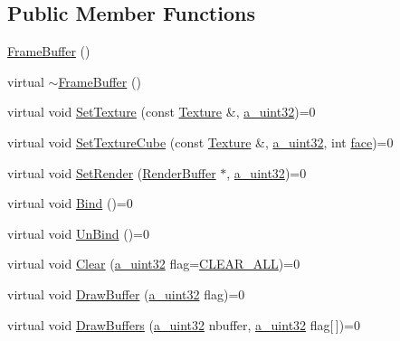 \subsection*{Public Member Functions}
\begin{DoxyCompactItemize}
\item 
\hyperlink{class_agmd_1_1_frame_buffer_a4c4496f6f37c392bccf0e2e40c96c41e}{Frame\+Buffer} ()
\item 
virtual \hyperlink{class_agmd_1_1_frame_buffer_a8a63285b76eb2c7c2b70e28b96c2b15f}{$\sim$\+Frame\+Buffer} ()
\item 
virtual void \hyperlink{class_agmd_1_1_frame_buffer_a76ffe93cffad0a95befbee4dc575487a}{Set\+Texture} (const \hyperlink{class_agmd_1_1_texture}{Texture} \&, \hyperlink{_common_defines_8h_a964296f9770051b9e4807b1f180dd416}{a\+\_\+uint32})=0
\item 
virtual void \hyperlink{class_agmd_1_1_frame_buffer_a8586a1e4fa08ec43a21f73139fa01fba}{Set\+Texture\+Cube} (const \hyperlink{class_agmd_1_1_texture}{Texture} \&, \hyperlink{_common_defines_8h_a964296f9770051b9e4807b1f180dd416}{a\+\_\+uint32}, int \hyperlink{_planet_8cpp_ae1161f79bdbe47164b23549af2139d25}{face})=0
\item 
virtual void \hyperlink{class_agmd_1_1_frame_buffer_ab31c37e22dba1f299186026d597d7377}{Set\+Render} (\hyperlink{class_agmd_1_1_render_buffer}{Render\+Buffer} $\ast$, \hyperlink{_common_defines_8h_a964296f9770051b9e4807b1f180dd416}{a\+\_\+uint32})=0
\item 
virtual void \hyperlink{class_agmd_1_1_frame_buffer_adbe54d16610cf433ed300797795d51f4}{Bind} ()=0
\item 
virtual void \hyperlink{class_agmd_1_1_frame_buffer_a8e656e8cdc0a35da9ef7ce8cfc162b25}{Un\+Bind} ()=0
\item 
virtual void \hyperlink{class_agmd_1_1_frame_buffer_a2ea4be225c7cfab68f85329022651b80}{Clear} (\hyperlink{_common_defines_8h_a964296f9770051b9e4807b1f180dd416}{a\+\_\+uint32} flag=\hyperlink{namespace_agmd_aeb00eaafdbba0fbe6b35d082f4ba0123a71cd6105bdf489841066bcc89fc2938b}{C\+L\+E\+A\+R\+\_\+\+A\+L\+L})=0
\item 
virtual void \hyperlink{class_agmd_1_1_frame_buffer_adf021c722b925f183980fb402fccec41}{Draw\+Buffer} (\hyperlink{_common_defines_8h_a964296f9770051b9e4807b1f180dd416}{a\+\_\+uint32} flag)=0
\item 
virtual void \hyperlink{class_agmd_1_1_frame_buffer_aa8c9362a32a4f8d83be2029adb341688}{Draw\+Buffers} (\hyperlink{_common_defines_8h_a964296f9770051b9e4807b1f180dd416}{a\+\_\+uint32} nbuffer, \hyperlink{_common_defines_8h_a964296f9770051b9e4807b1f180dd416}{a\+\_\+uint32} flag\mbox{[}$\,$\mbox{]})=0

\end{DoxyCompactItemize}
